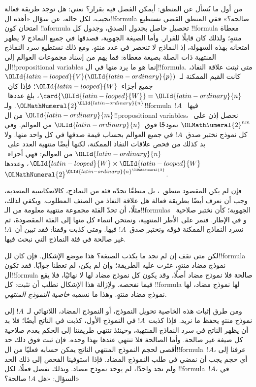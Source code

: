 \documentclass[../../../include/open-logic-section]{subfiles}
\begin{document}


من أول ما يُسأل عن المنطق: أيمكن الفصل فيه بقرار؟ نعني:
هل توجد طريقة فعالة تجيب، لكل حالة، عن سؤال «أهذه
ال!!{formula} صالحة؟» ففي المنطق القضي نستطيع امتحان
كون !!a{formula} تحصيل حاصل بجدول الصدق، وجدول كل
!!{formula} معطاة منتهٍ؛ ولذلك كان قابلًا للقرار.
وأما الصيغة الجهوية، فصدقها في جميع النماذج لا يظهر
امتحانه بهذه السهولة، إذ النماذج لا تنحصر في عدد منتهٍ.
ومع ذلك نستطيع سرد النماذج المنتهية ذات الصلة بصيغة معطاة:
فما يهم من إسناد مجموعات العوالم إلى ال!!{propositional variable}s
إنما هو ما يرد منها في ال!!{formula}. متى ثبتت علاقة
النفاذ، كانت القيم الممكنة لـ~${\OLId{latin-looped}{V}}({\OLId{latin-ordinary}{p}})$ جميع أجزاء~${\OLId{latin-looped}{W}}$؛
فإذا كان~$\card{{\OLId{latin-looped}{W}}}={\OLId{latin-ordinary}{n}}$، بلغ عددها~${\OLMathNumeral{2}}^{\OLId{latin-ordinary}{n}}$. ولـ!!{formula}~$!A$
فيها~${\OLId{latin-ordinary}{m}}$ من ال!!{propositional
  variable}s، نحصل إذن على~${\OLMathNumeral{2}}^{nm}$ نموذجًا فوق~${\OLId{latin-ordinary}{n}}$
من العوالم. وفي كل نموذج نختبر صدق~$!A$ في جميع
العوالم بحساب قيمة صدقها في كل واحد منها. ولا بد كذلك
من فحص علاقات النفاذ الممكنة، لكنها أيضًا منتهية العدد
على~${\OLId{latin-ordinary}{n}}$ من العوالم: فهي أجزاء~${\OLId{latin-looped}{W}} \times {\OLId{latin-looped}{W}}$،
وعددها~${\OLMathNumeral{2}}^{{\OLId{latin-ordinary}{n}}^{\OLMathNumeral{2}}}$.

فإن لم يكن المقصود منطق~، بل منطقًا تحدّه
فئة من النماذج، كالانعكاسية المتعدية، وجب أن نعرف أيضًا
بطريقة فعالة هل علاقة النفاذ من الصنف المطلوب. ويكفي
لذلك، مثلًا، أن تحدّ الفئة مجموعة منتهية معلومة من
الـ!!{formula}s الجهوية؛ كأن نختبر صلاحية~
و في الإطار.
فنمر على الأطر المنتهية، ونمتحن انتماء كل منها إلى
الفئة المقصودة، ثم نسرد النماذج الممكنة فوقه ونختبر
صدق~$!A$ فيها. ومتى كذبت وقفنا: فقد تبين أن~$!A$
غير صالحة في فئة النماذج التي نبحث فيها.

لكن متى نقف إن لم نجد ما يكذب الصيغة؟ هذا موضع
الإشكال. فإن كان لل!!{formula} نموذج مضاد منتهٍ،
عثرت عليه الطريقة؛ وإن لم يكن، لم تعطنا جوابًا.
فقد تكون ال!!{formula} صالحة فلا نموذج مضاد أصلًا،
وقد يكون كل نموذج مضاد لها لا نهائيًا، فلا يقع
فيما نفحصه. ولإزالة هذا الإشكال نطلب أن نثبت:
كل !!{formula} لها نموذج مضاد، لها نموذج مضاد منتهٍ.
وهذا ما نسميه \emph{خاصية النموذج المنتهي}.

ومن طرق إثبات هذه الخاصية تحويل النموذج، أو النموذج
المضاد، اللانهائي لـ~$!A$ إلى نموذج منتهٍ يحفظ ما
نريد. فإذا كذبت~$!A$ في النموذج الأول، كذبت في
الناتج أيضًا؛ فلا بد أن يظهر الناتج في سرد النماذج
المنتهية، وحينئذ تنتهي طريقتنا إلى الحكم بعدم صلاحية
كل صيغة غير صالحة. وأما الصالحة فلا تنتهي عندها
بهذا وحده. فإن ثبت فوق ذلك حد أقصى لحجم النموذج
المنتهي الناتج يمكن حسابه فعليًا من ال!!{formula}~$!A$،
عرفنا إلى أي حجم يجب أن نمضي في طلب النموذج المضاد.
فإذا استوفينا الفحص إلى ذلك الحد ولم نجد واحدًا،
لم يوجد نموذج مضاد. وبذلك نفصل فعلًا، لكل
!!{formula}~$!A$، في السؤال: «هل $!A$ صالحة؟»
\end{document}
